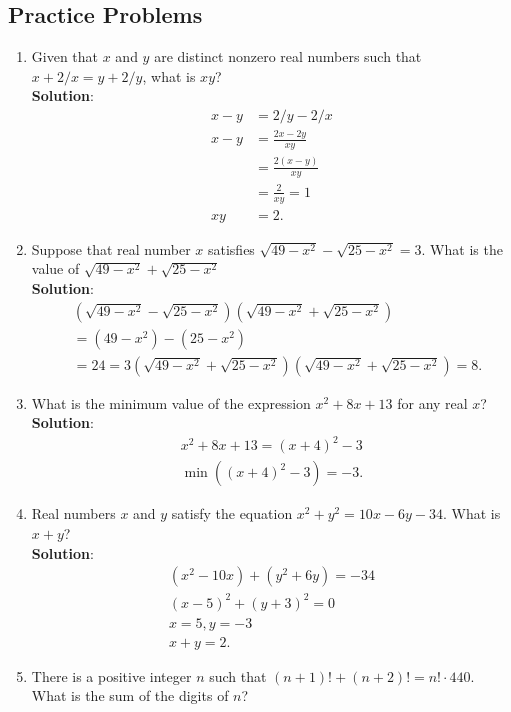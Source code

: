\subsection{Practice Problems}
\begin{enumerate}
  \item Given that $x$ and $y$ are distinct nonzero real numbers such that $x+2/x=y+2/y$, what is $xy$?
  \\ \textbf{Solution}: 
  \begin{align*}
    x - y &= 2/y - 2/x \\
    x - y &= \frac{2x - 2y}{xy} \\
    &= \frac{2(x-y)}{xy} \\
    &= \frac{2}{xy} = 1 \\
    xy &= \boxed{2}.
  \end{align*}
  \item Suppose that real number $x$ satisfies $\sqrt{49-x^2} - \sqrt{25 - x^2} = 3$. What is the value of $\sqrt{49-x^2} + \sqrt{25 - x^2}$
  \\ \textbf{Solution}:
  \begin{align*}
    &(\sqrt{49-x^2} - \sqrt{25 - x^2})(\sqrt{49-x^2} + \sqrt{25 - x^2}) \\
    &= (49-x^2) - (25 - x^2) \\
    &= 24 = 3(\sqrt{49-x^2} + \sqrt{25 - x^2})
    (\sqrt{49-x^2} + \sqrt{25 - x^2}) = \boxed{8}.
  \end{align*}
  \item What is the minimum value of the expression $x^2 + 8x + 13$ for any real $x$?
  \\ \textbf{Solution}:
  \begin{align*}
    x^2 + 8x + 13 = (x + 4)^2 - 3 \\
    \min((x + 4)^2 - 3) = \boxed{-3}.
  \end{align*}
  \item Real numbers $x$ and $y$ satisfy the equation $x^2+y^2=10x-6y-34$. What is $x+y$?
  \\ \textbf{Solution}:
  \begin{align*}
    (x^2-10x) + (y^2+6y) = -34 \\
    (x-5)^2+(y+3)^2 = 0 \\
    x = 5, y = -3 \\
    x+y = \boxed{2}.
  \end{align*}
  \item There is a positive integer $n$ such that $(n+1)!+(n+2)! = n!\cdot 440$. What is the sum of the digits of $n$?

\end{enumerate}
